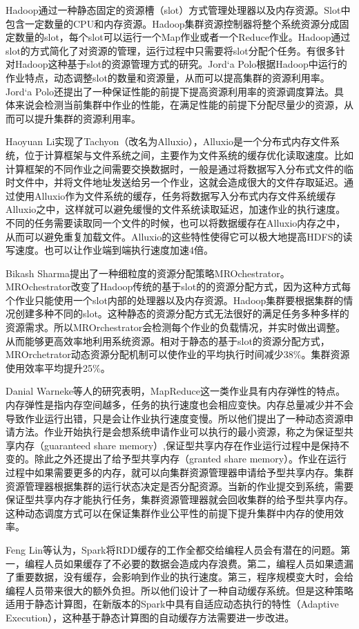 Hadoop通过一种静态固定的资源槽（slot）方式管理处理器以及内存资源。Slot中包含一定数量的CPU和内存资源。Hadoop集群资源控制器将整个系统资源分成固定数量的slot，每个slot可以运行一个Map作业或者一个Reduce作业。Hadoop通过slot的方式简化了对资源的管理，运行过程中只需要将slot分配个任务。有很多针对Hadoop这种基于slot的资源管理方式的研究。Jord`a Polo根据Hadoop中运行的作业特点，动态调整slot的数量和资源量，从而可以提高集群的资源利用率。Jord`a Polo还提出了一种保证性能的前提下提高资源利用率的资源调度算法。具体来说会检测当前集群中作业的性能，在满足性能的前提下分配尽量少的资源，从而可以提升集群的资源利用率。

Haoyuan Li实现了Tachyon（改名为Alluxio），Alluxio是一个分布式内存文件系统，位于计算框架与文件系统之间，主要作为文件系统的缓存优化读取速度。比如计算框架的不同作业之间需要交换数据时，一般是通过将数据写入分布式文件的临时文件中，并将文件地址发送给另一个作业，这就会造成很大的文件存取延迟。通过使用Alluxio作为文件系统的缓存，任务将数据写入分布式内存文件系统缓存Alluxio之中，这样就可以避免缓慢的文件系统读取延迟，加速作业的执行速度。不同的任务需要读取同一个文件的时候，也可以将数据缓存在Alluxio内存之中，从而可以避免重复加载文件。Alluxio的这些特性使得它可以极大地提高HDFS的读写速度。也可以让作业端到端执行速度加速4倍。

Bikash Sharma提出了一种细粒度的资源分配策略MROchestrator。MROchestrator改变了Hadoop传统的基于slot的的资源分配方式，因为这种方式每个作业只能使用一个slot内部的处理器以及内存资源。Hadoop集群要根据集群的情况创建多种不同的slot。这种静态的资源分配方式无法很好的满足任务多种多样的资源需求。所以MROrchestrator会检测每个作业的负载情况，并实时做出调整。从而能够更高效率地利用系统资源。相对于静态的基于slot的资源分配方式，MROrchetrator动态资源分配机制可以使作业的平均执行时间减少38\%。集群资源使用效率平均提升25\%。

Danial Warneke等人的研究表明，MapReduce这一类作业具有内存弹性的特点。内存弹性是指内存空间越多，任务的执行速度也会相应变快。内存总量减少并不会导致作业运行出错，只是会让作业执行速度变慢。所以他们提出了一种动态资源申请方法。作业开始执行是会想系统申请作业可以执行的最小资源，称之为保证型共享内存（guaranteed share memory）,保证型共享内存在作业运行过程中是保持不变的。除此之外还提出了给予型共享内存（granted share memory）。作业在运行过程中如果需要更多的内存，就可以向集群资源管理器申请给予型共享内存。集群资源管理器根据集群的运行状态决定是否分配资源。当新的作业提交到系统，需要保证型共享内存才能执行任务，集群资源管理器就会回收集群的给予型共享内存。这种动态调度方式可以在保证集群作业公平性的前提下提升集群中内存的使用效率。

Feng Lin等认为，Spark将RDD缓存的工作全都交给编程人员会有潜在的问题。第一，编程人员如果缓存了不必要的数据会造成内存浪费。第二，编程人员如果遗漏了重要数据，没有缓存，会影响到作业的执行速度。第三，程序规模变大时，会给编程人员带来很大的额外负担。所以他们设计了一种自动缓存系统。但是这种策略适用于静态计算图，在新版本的Spark中具有自适应动态执行的特性（Adaptive Execution），这种基于静态计算图的自动缓存方法需要进一步改进。

